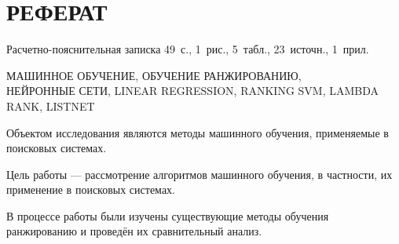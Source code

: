 \chapter*{РЕФЕРАТ}

Расчетно-пояснительная записка 49~с., 1~рис., 5~табл., 23~источн., 1~прил.

\noindent\MakeUppercase{машинное обучение, обучение ранжированию,\\нейронные сети, linear regression, ranking svm, lambda rank, listnet}

Объектом исследования являются методы машинного обучения, применяемые в поисковых системах.

Цель работы --- рассмотрение алгоритмов машинного обучения, в частности, их применение в поисковых системах.

В процессе работы были изучены существующие методы обучения ранжированию и проведён их сравнительный анализ.

\setcounter{page}{3}